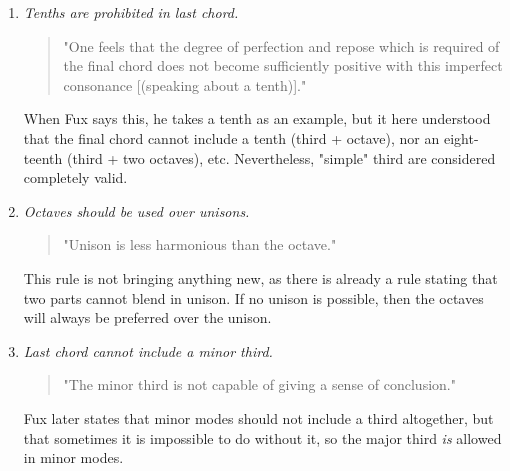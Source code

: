 \begin{enumerate}[wide, label=\bfseries 1.H\arabic*]
    \item\label{rule:tenth-is-last-chord} \reddot \textit{Tenths are prohibited in last chord.}

    \begin{quotation}
    "One feels that the degree of perfection and repose which is required of the final chord does not become sufficiently positive with this imperfect consonance [(speaking about a tenth)]."
    \textcite[p.77]{GaPEng}
    \end{quotation}

    When Fux says this, he takes a tenth as an example, but it here understood that the final chord cannot include a tenth (third + octave), nor an eight-teenth (third + two octaves), etc. Nevertheless, "simple" third are considered completely valid.

    \item\label{rule:unison-vs-octave} \reddot \textit{Octaves should be used over unisons.}

    \begin{quotation}
    "Unison is less harmonious than the octave."
    \textcite[p.79]{GaPEng}
    \end{quotation}

    This rule is not bringing anything new, as there is already a rule stating that two parts cannot blend in unison. If no unison is possible, then the octaves will always be preferred over the unison.

    \item\label{rule:minor-third} \reddot \textit{Last chord cannot include a minor third.}

    \begin{quotation}
    "The minor third is not capable of giving a sense of conclusion."
    \textcite[p.80]{GaPEng}
    \end{quotation}

    Fux later states that minor modes should not include a third altogether, but that sometimes it is impossible to do without it, so the major third \textit{is} allowed in minor modes.

\end{enumerate}

